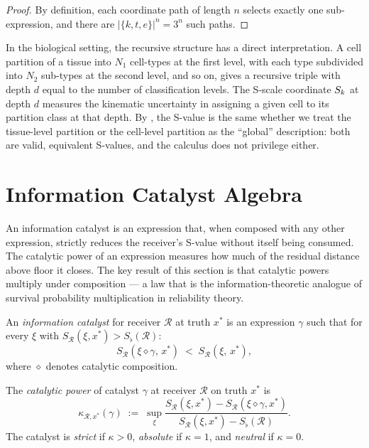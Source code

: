 \begin{proof}
By definition, each coordinate path of length $n$ selects exactly one
sub-expression, and there are $|\{k, t, e\}|^n = 3^n$ such paths.
\end{proof}

\begin{remark}
\label{rem:cellular-partition}
In the biological setting, the recursive structure has a direct
interpretation.  A cell partition of a tissue into $N_1$ cell-types at the
first level, with each type subdivided into $N_2$ sub-types at the second
level, and so on, gives a recursive triple with depth $d$ equal to the
number of classification levels.  The S-scale coordinate $S_k$ at depth $d$
measures the kinematic uncertainty in assigning a given cell to its
partition class at that depth.  By , the S-value is
the same whether we treat the tissue-level partition or the cell-level
partition as the ``global'' description: both are valid, equivalent S-values,
and the calculus does not privilege either.
\end{remark}

\section{Information Catalyst Algebra}
\label{sec:catalyst-algebra}

An information catalyst is an expression that, when composed with any other
expression, strictly reduces the receiver's S-value without itself being
consumed.  The catalytic power of an expression measures how much of the
residual distance above floor it closes.  The key result of this section is
that catalytic powers multiply under composition — a law that is the
information-theoretic analogue of survival probability multiplication in
reliability theory.

\begin{definition}
\label{def:info-catalyst}
An \emph{information catalyst} for receiver $\mathcal{R}$ at truth $x^*$
is an expression $\gamma$ such that for every $\xi$ with
$S_{\mathcal{R}}(\xi, x^*) > S_\flat(\mathcal{R})$:
\[
  S_{\mathcal{R}}(\xi \diamond \gamma,\, x^*)
  \;<\; S_{\mathcal{R}}(\xi,\, x^*) ,
\]
where $\diamond$ denotes catalytic composition.
\end{definition}

\begin{definition}
\label{def:catalytic-power}
The \emph{catalytic power} of catalyst $\gamma$ at receiver $\mathcal{R}$
on truth $x^*$ is
\[
  \kappa_{\mathcal{R}, x^*}(\gamma)
  \;:=\;
  \sup_{\xi}
  \frac{S_{\mathcal{R}}(\xi, x^*) - S_{\mathcal{R}}(\xi \diamond \gamma, x^*)}
       {S_{\mathcal{R}}(\xi, x^*) - S_\flat(\mathcal{R})} .
\]
The catalyst is \emph{strict} if $\kappa > 0$, \emph{absolute} if
$\kappa = 1$, and \emph{neutral} if $\kappa = 0$.
\end{definition}

